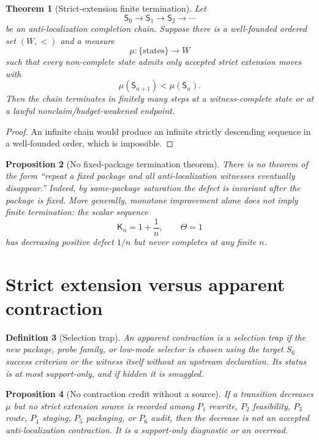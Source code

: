 \documentclass[11pt]{article}
\newtheorem{theorem}{Theorem}[section]
\newtheorem{proposition}[theorem]{Proposition}
\newtheorem{definition}[theorem]{Definition}
\newcommand{\K}{\mathsf K}
\newcommand{\Sstate}{\mathsf S}
\begin{document}
\begin{theorem}[Strict-extension finite termination]
Let
\[
  \Sstate_0\to\Sstate_1\to\Sstate_2\to\cdots
\]
be an anti-localization completion chain. Suppose there is a well-founded ordered set $(W,<)$ and a measure
\[
  \mu:\{\text{states}\}\to W
\]
such that every non-complete state admits only accepted strict extension moves with
\[
  \mu(\Sstate_{n+1})<\mu(\Sstate_n).
\]
Then the chain terminates in finitely many steps at a witness-complete state or at a lawful nonclaim/budget-weakened endpoint.
\end{theorem}

\begin{proof}
An infinite chain would produce an infinite strictly descending sequence in a well-founded order, which is impossible.
\end{proof}

\begin{proposition}[No fixed-package termination theorem]
There is no theorem of the form ``repeat a fixed package and all anti-localization witnesses eventually disappear.'' Indeed, by same-package saturation the defect is invariant after the package is fixed. More generally, monotone improvement alone does not imply finite termination: the scalar sequence
\[
  \K_n=1+\frac1n,
  \qquad \Theta=1
\]
has decreasing positive defect $1/n$ but never completes at any finite $n$.
\end{proposition}

\section{Strict extension versus apparent contraction}

\begin{definition}[Selection trap]
An apparent contraction is a selection trap if the new package, probe family, or low-mode selector is chosen using the target $S_6$ success criterion or the witness itself without an upstream declaration. Its status is at most support-only, and if hidden it is smuggled.
\end{definition}

\begin{proposition}[No contraction credit without a source]
If a transition decreases $\mu$ but no strict extension source is recorded among $P_1$ rewrite, $P_2$ feasibility, $P_3$ route, $P_4$ staging, $P_5$ packaging, or $P_6$ audit, then the decrease is not an accepted anti-localization contraction. It is a support-only diagnostic or an overread.
\end{proposition}
\end{document}

